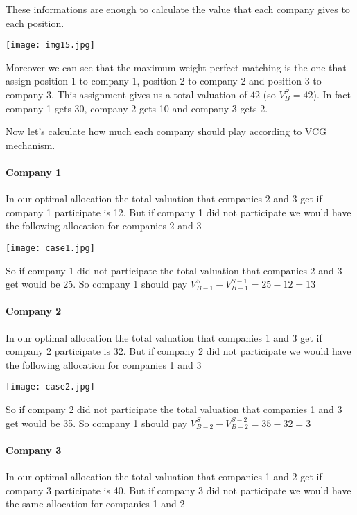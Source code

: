 These informations are enough to calculate the value that each company gives to each position.

\centerline{
\texttt{[image: img15.jpg]}}

Moreover we can see that the maximum weight perfect matching is the one that assign position 1 to company 1, position 2 to company 2 and position 3 to company 3. This assignment gives us a total valuation of $42$ (so $V_{B}^{S}=42$). In fact company 1 gets 30, company 2 gets 10 and company 3 gets 2. 

Now let's calculate how much each company should play according to VCG mechanism.

\paragraph{Company 1} 

In our optimal allocation the total valuation that companies 2 and 3 get if company 1 participate is 12. But if company 1 did not participate we would have the following allocation for companies 2 and 3

\centerline{
\texttt{[image: case1.jpg]}}

So if company 1 did not participate the total valuation that companies 2 and 3 get would be 25. So company 1 should pay $V_{B-1}^{S}-V_{B-1}^{S-1}=25-12=13$

\paragraph{Company 2}

In our optimal allocation the total valuation that companies 1 and 3 get if company 2 participate is 32. But if company 2 did not participate we would have the following allocation for companies 1 and 3

\centerline{
\texttt{[image: case2.jpg]}}

So if company 2 did not participate the total valuation that companies 1 and 3 get would be 35. So company 1 should pay $V_{B-2}^{S}-V_{B-2}^{S-2}=35-32=3$

\paragraph{Company 3}

In our optimal allocation the total valuation that companies 1 and 2 get if company 3 participate is 40. But if company 3 did not participate we would have the same allocation for companies 1 and 2

